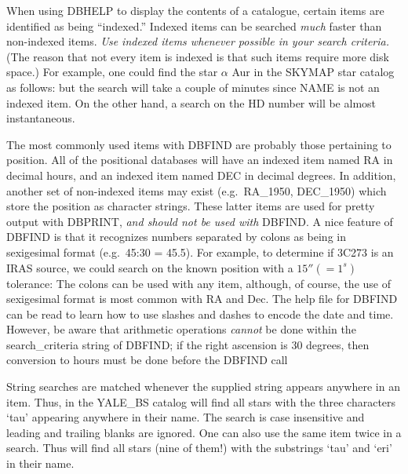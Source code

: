 When using DBHELP to display the contents of a catalogue, certain items are
identified as being ``indexed.''  Indexed items can be searched {\em much} 
faster than non-indexed items. 
{\em Use indexed items whenever possible in your search criteria.}   
(The reason that not every item is indexed is that such items require more disk
space.)
For example, one could find
the star $\alpha$ Aur in the SKYMAP star catalog as follows:
\exbegin
{}
\exend
but the search will take a couple of  minutes since NAME is not an indexed
item.  On the other hand, a search on the HD number will be almost
instantaneous.
\exbegin
{}
\exend 

The most commonly used items with DBFIND are probably those 
pertaining to position.
All of the positional databases will have an indexed item named RA in decimal
hours, and an indexed item named DEC in decimal degrees.  In addition, another
set of non-indexed items may exist (e.g.\ RA\_1950, DEC\_1950) which store
the position as character strings.  These latter items are used for pretty
output with DBPRINT, {\em and should not be used with} DBFIND.  A nice
feature of DBFIND is that it recognizes numbers separated by colons as being
in sexigesimal format (e.g.\  45:30 = 45.5).
For example, to determine if 3C273 is an IRAS source, we could search on the
known position with a $15'' (=1^s)$ tolerance:
\exbegin
{}
\exend
The colons can be used with any item, although, of course, the use of 
sexigesimal format is most common with RA and Dec.   The help file for
DBFIND can be read to learn how to use slashes and dashes to encode the
date and time.  However, be aware that arithmetic operations {\em cannot}
be done within the search\_criteria string of DBFIND; if the right ascension
is 30 degrees, then conversion to hours must be done before the DBFIND call
\exbegin
{}
\exend

String searches are matched whenever the supplied string appears anywhere in
an item.   Thus, in the YALE\_BS catalog
will find all stars with the three characters `tau' appearing anywhere in
their name.    The search is case insensitive and leading and trailing blanks 
are ignored.   One can also use the same item twice in a search.   Thus
will find all stars (nine of them!) with the substrings `tau' and `eri' in
their name.

